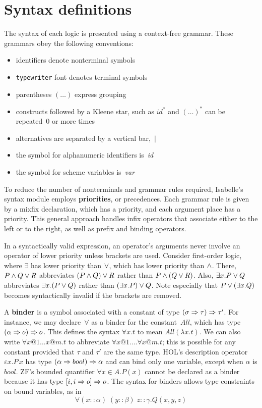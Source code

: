 
\chapter{Syntax definitions}
The syntax of each logic is presented using a context-free grammar.
These grammars obey the following conventions:
\begin{itemize}
\item identifiers denote nonterminal symbols
\item \texttt{typewriter} font denotes terminal symbols
\item parentheses $(\ldots)$ express grouping
\item constructs followed by a Kleene star, such as $id^*$ and $(\ldots)^*$
can be repeated~0 or more times 
\item alternatives are separated by a vertical bar,~$|$
\item the symbol for alphanumeric identifiers is~{\it id\/} 
\item the symbol for scheme variables is~{\it var}
\end{itemize}
To reduce the number of nonterminals and grammar rules required, Isabelle's
syntax module employs {\bf priorities}, or precedences.
Each grammar rule is given by a mixfix declaration, which has a priority,
and each argument place has a priority.  This general approach handles
infix operators that associate either to the left or to the right, as well
as prefix and binding operators.

In a syntactically valid expression, an operator's arguments never involve
an operator of lower priority unless brackets are used.  Consider
first-order logic, where $\exists$ has lower priority than $\vee$,
which has lower priority than $\wedge$.  There, $P\wedge Q \vee R$
abbreviates $(P\wedge Q) \vee R$ rather than $P\wedge (Q\vee R)$.  Also,
$\exists x.P\vee Q$ abbreviates $\exists x.(P\vee Q)$ rather than
$(\exists x.P)\vee Q$.  Note especially that $P\vee(\exists x.Q)$
becomes syntactically invalid if the brackets are removed.

A {\bf binder} is a symbol associated with a constant of type
$(\sigma\Rightarrow\tau)\Rightarrow\tau'$.  For instance, we may declare~$\forall$ as a binder
for the constant~$All$, which has type $(\alpha\Rightarrow o)\Rightarrow o$.  This defines the
syntax $\forall x.t$ to mean $All(\lambda x.t)$.  We can also write $\forall
x@1\ldots x@m.t$ to abbreviate $\forall x@1.  \ldots \forall x@m.t$; this is
possible for any constant provided that $\tau$ and $\tau'$ are the same type.
HOL's description operator $\varepsilon x.P\,x$ has type $(\alpha\Rightarrow
bool)\Rightarrow\alpha$ and can bind only one variable, except when $\alpha$ is
$bool$.  ZF's bounded quantifier $\forall x\in A.P(x)$ cannot be declared as a
binder because it has type $[i, i\Rightarrow o]\Rightarrow o$.  The syntax for binders allows
type constraints on bound variables, as in
\[ \forall (x{::}\alpha) \; (y{::}\beta) \; z{::}\gamma. Q(x,y,z) \]

